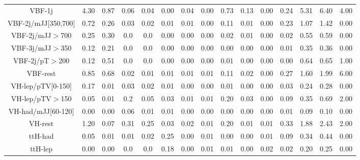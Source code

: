 \begin{table}[htb]
\begin{center}
{\begin{tabular}{cccccccc|cccc|cc|c}
\\
VBF-1j & 4.30 & 0.87 & 0.06 & 0.04 & 0.00 & 0.04 & 0.00 & 0.73 & 0.13 & 0.00 & 0.24 & 5.31 & 6.40 & 4.00
\\
VBF-2j/mJJ[350,700] & 0.72 & 0.26 & 0.03 & 0.02 & 0.01 & 0.01 & 0.00 & 0.11 & 0.01 & 0.00 & 0.23 & 1.07 & 1.42 & 0.00
\\
VBF-2j/mJJ$>$700 & 0.25 & 0.30 & 0.0 & 0.0 & 0.00 & 0.00 & 0.00 & 0.02 & 0.01 & 0.00 & 0.02 & 0.55 & 0.59 & 0.00
\\
VBF-3j/mJJ$>$350 & 0.12 & 0.21 & 0.0 & 0.0 & 0.00 & 0.00 & 0.00 & 0.00 & 0.00 & 0.00 & 0.01 & 0.35 & 0.36 & 0.00
\\
VBF-2j/pT$>$200 & 0.12 & 0.51 & 0.0 & 0.0 & 0.00 & 0.00 & 0.00 & 0.01 & 0.00 & 0.00 & 0.00 & 0.64 & 0.65 & 1.00
\\
VBF-rest & 0.85 & 0.68 & 0.02 & 0.01 & 0.01 & 0.01 & 0.01 & 0.11 & 0.02 & 0.00 & 0.27 & 1.60 & 1.99 & 6.00
\\
VH-lep/pTV[0-150] & 0.17 & 0.01 & 0.03 & 0.02 & 0.01 & 0.00 & 0.00 & 0.01 & 0.00 & 0.00 & 0.03 & 0.24 & 0.28 & 0.00
\\
VH-lep/pTV$>$150 & 0.05 & 0.01 & 0.2 & 0.05 & 0.03 & 0.01 & 0.01 & 0.20 & 0.03 & 0.00 & 0.09 & 0.35 & 0.69 & 2.00
\\
VH-had/mJJ[60-120] & 0.00 & 0.00 & 0.06 & 0.01 & 0.01 & 0.00 & 0.00 & 0.00 & 0.00 & 0.00 & 0.01 & 0.09 & 0.10 & 0.00
\\
VH-rest & 1.20 & 0.07 & 0.31 & 0.25 & 0.03 & 0.02 & 0.01 & 0.20 & 0.01 & 0.01 & 0.33 & 1.88 & 2.43 & 2.00
\\
ttH-had & 0.05 & 0.01 & 0.01 & 0.02 & 0.25 & 0.00 & 0.01 & 0.00 & 0.00 & 0.01 & 0.09 & 0.34 & 0.44 & 0.00
\\
ttH-lep & 0.00 & 0.00 & 0.0 & 0.0 & 0.18 & 0.00 & 0.01 & 0.01 & 0.00 & 0.02 & 0.02 & 0.20 & 0.25 & 0.00
\\


\hline
				\hline
		\end{tabular}}
	\end{center}
\end{table}

\clearpage